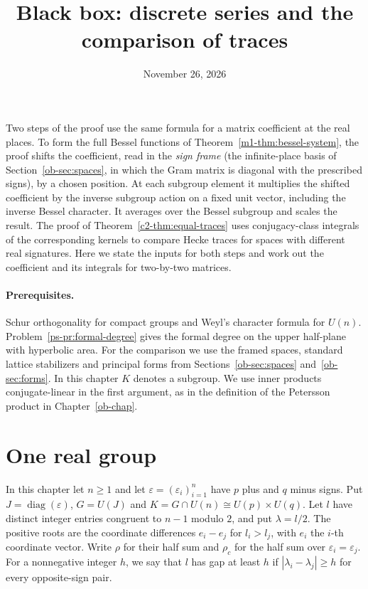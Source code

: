 \documentclass[reqno]{amsart}
\title{Black box: discrete series and the comparison of traces}
\author{}
\date{November 26, 2026}
\newcounter{chap}
\theoremstyle{definition}
\newcommand{\diag}{\operatorname{diag}}
\begin{document}
\maketitle
{}\label{chap}

Two steps of the proof use the same formula for a matrix coefficient at the real places. To form the full Bessel functions of Theorem~\ref{m1-thm:bessel-system}, the proof shifts the coefficient, read in the \emph{sign frame} (the infinite-place basis of Section~\ref{ob-sec:spaces}, in which the Gram matrix is diagonal with the prescribed signs), by a chosen position. At each subgroup element it multiplies the shifted coefficient by the inverse subgroup action on a fixed unit vector, including the inverse Bessel character. It averages over the Bessel subgroup and scales the result. The proof of Theorem~\ref{c2-thm:equal-traces} uses conjugacy-class integrals of the corresponding kernels to compare Hecke traces for spaces with different real signatures. Here we state the inputs for both steps and work out the coefficient and its integrals for two-by-two matrices.

\paragraph{Prerequisites.}
Schur orthogonality for compact groups and Weyl's character formula for \(U(n)\).
Problem~\ref{ps-pr:formal-degree} gives the formal degree on the upper half-plane with hyperbolic area. For the comparison we use the framed spaces, standard lattice stabilizers and principal forms from Sections~\ref{ob-sec:spaces} and~\ref{ob-sec:forms}. In this chapter \(K\) denotes a subgroup. We use inner products conjugate-linear in the first argument, as in the definition of the Petersson product in Chapter~\ref{ob-chap}.

\section{One real group}\label{sec:real}

In this chapter let \(n\ge 1\) and let \(\varepsilon=(\varepsilon_i)_{i=1}^n\) have \(p\) plus and \(q\) minus signs. Put \(J=\diag(\varepsilon)\), \(G=U(J)\) and \(K=G\cap U(n)\cong U(p)\times U(q)\).
Let \(l\) have distinct integer entries congruent to \(n-1\) modulo \(2\), and put \(\lambda=l/2\). The positive roots are the coordinate differences \(e_i-e_j\) for \(l_i>l_j\), with \(e_i\) the \(i\)-th coordinate vector. Write \(\rho\) for their half sum and \(\rho_c\) for the half sum over \(\varepsilon_i=\varepsilon_j\). For a nonnegative integer \(h\), we say that \(l\) has gap at least \(h\) if \(|\lambda_i-\lambda_j|\ge h\) for every opposite-sign pair.
\end{document}
